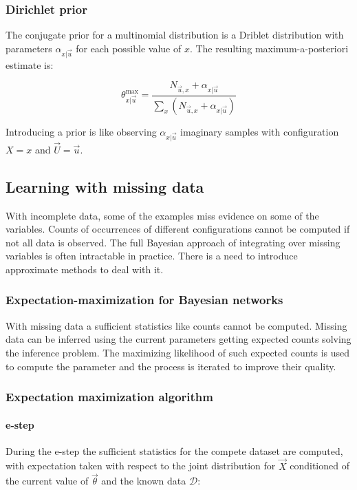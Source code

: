 		\subsubsection{Dirichlet prior}
		The conjugate  prior for a multinomial distribution is a Driblet distribution with parameters $\alpha_{x|\vec{u}}$ for each possible value of $x$.
		The resulting maximum-a-posteriori estimate is:

		$$\theta_{x|\vec{u}}^{\max} = \frac{N_{\vec{u},x} + \alpha_{x|\vec{u}}}{\sum\limits_{x}(N_{\vec{u},x}+\alpha_{x|\vec{u}})}$$

		Introducing a prior is like observing $\alpha_{x|\vec{u}}$ imaginary samples with configuration $X=x$ and $\vec{U}=\vec{u}$.

	\subsection{Learning with missing data}
	With incomplete data, some of the examples miss evidence on some of the variables.
	Counts of occurrences of different configurations cannot be computed if not all data is observed.
	The full Bayesian approach of integrating over missing variables is often intractable in practice.
	There is a need to introduce approximate methods to deal with it.

		\subsubsection{Expectation-maximization for Bayesian networks}
		With missing data a sufficient statistics like counts cannot be computed.
		Missing data can be inferred using the current parameters getting expected counts solving the inference problem.
		The maximizing likelihood of such expected counts is used to compute the parameter and the process is iterated to improve their quality.

		\subsubsection{Expectation maximization algorithm}

			\paragraph{e-step}
			During the e-step the sufficient statistics for the compete dataset are computed, with expectation taken with respect to the joint distribution for $\vec{X}$ conditioned of the current value of $\vec{\theta}$ and the known data $\mathcal{D}$:

